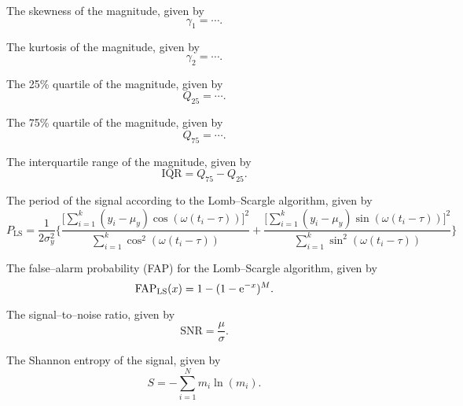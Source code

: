 \begin{enumerate}
 The skewness of the magnitude, given by
\begin{equation}\gamma_1 = \cdots.\end{equation}

 The kurtosis of the magnitude, given by
\begin{equation}\gamma_2 = \cdots.\end{equation}

 The 25\% quartile of the magnitude, given by
\begin{equation}Q_{25} = \cdots.\end{equation}

 The 75\% quartile of the magnitude, given by
\begin{equation}Q_{75} = \cdots.\end{equation}

 The interquartile range of the magnitude, given by
\begin{equation}\text{IQR} = Q_{75} -Q_{25}.\end{equation}

 The period of the signal according to the Lomb--Scargle algorithm, given by
\begin{equation}P_{\text{LS}} = \frac{1}{2 \sigma_y^2} \Bigg\{ \frac{\big[\sum\limits_{i=1}^k (y_i - \mu_y) \cos(\omega(t_i - \tau))\big]^2}{\sum\limits_{i=1}^k \cos^2(\omega(t_i - \tau))} + \frac{\big[\sum\limits_{i=1}^k (y_i - \mu_y) \sin(\omega(t_i - \tau))\big]^2}{\sum\limits_{i=1}^k \sin^2(\omega(t_i - \tau))}\Bigg\}\end{equation}

 The false--alarm probability (FAP) for the Lomb--Scargle algorithm, given by
\begin{equation}\text{FAP}_{\text{LS}}(x) = 1 - (1 - \mathrm{e}^{-x})^M.\end{equation}

 The signal--to--noise ratio, given by
\begin{equation}\text{SNR} = \frac{\mu}{\sigma}.\end{equation}

 The Shannon entropy of the signal, given by
\begin{equation}S = -\sum\limits_{i=1}^N m_i \ln(m_i).\end{equation}


\end{enumerate}
